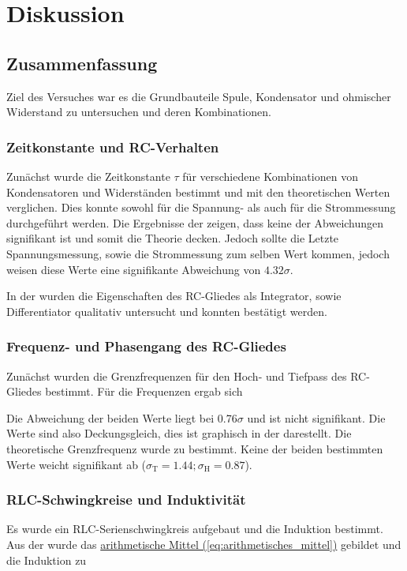 \chapter{Diskussion}
\label{ch:Diskussion}

\section{Zusammenfassung}
\label{sec:Zusammenfassung}

Ziel des Versuches war es die Grundbauteile Spule, Kondensator und ohmischer Widerstand zu untersuchen und deren Kombinationen.

\subsection*{Zeitkonstante und RC-Verhalten}
Zunächst wurde die Zeitkonstante $\tau$ für verschiedene Kombinationen von Kondensatoren und Widerständen bestimmt und mit den theoretischen Werten verglichen. Dies konnte sowohl für die Spannung- als auch für die Strommessung durchgeführt werden. Die Ergebnisse der  zeigen, dass keine der Abweichungen signifikant ist und somit die Theorie decken. Jedoch sollte die Letzte Spannungsmessung, sowie die Strommessung zum selben Wert kommen, jedoch weisen diese Werte eine signifikante Abweichung von $4.32\sigma$.

In der  wurden die Eigenschaften des RC-Gliedes als Integrator, sowie Differentiator qualitativ untersucht und konnten bestätigt werden.

\subsection*{Frequenz- und Phasengang des RC-Gliedes}
Zunächst wurden die Grenzfrequenzen für den Hoch- und Tiefpass des RC-Gliedes bestimmt. Für die Frequenzen ergab sich


Die Abweichung der beiden Werte liegt bei 0.76$\sigma$ und ist nicht signifikant. Die Werte sind also Deckungsgleich, dies ist graphisch in der  darestellt. 
Die theoretische Grenzfrequenz wurde zu
bestimmt. Keine der beiden bestimmten Werte weicht signifikant ab ($\sigma_\text{T} = 1.44; \sigma_\text{H} = 0.87$).

\subsection*{RLC-Schwingkreise und Induktivität}
Es wurde ein RLC-Serienschwingkreis aufgebaut und die Induktion bestimmt. Aus der  wurde das \hyperref[eq:arithmetisches_mittel]{arithmetische Mittel (\ref*{eq:arithmetisches_mittel})} gebildet und die Induktion zu


